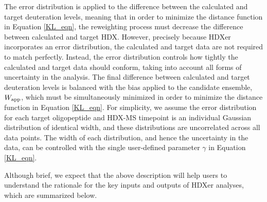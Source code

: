 \documentclass[9pt,tutorial,ASAPversion]{livecoms}
\begin{document}
The error distribution is applied to the difference between the calculated and target deuteration levels, meaning that in order to minimize the distance function in Equation \ref{KL_eqn}, the reweighting process must decrease the difference between calculated and target HDX. 
However, precisely because HDXer incorporates an error distribution, the calculated and target data are not required to match perfectly.
Instead, the error distribution controls how tightly the calculated and target data should conform, taking into account all forms of uncertainty in the analysis.
The final difference between calculated and target deuteration levels is balanced with the bias applied to the candidate ensemble, $W_\textnormal{app}$, which must be simultaneously minimized in order to minimize the distance function in Equation \ref{KL_eqn}. 
For simplicity, we assume the error distribution for each target oligopeptide and HDX-MS timepoint is an individual Gaussian distribution of identical width, and these distributions are uncorrelated across all data points.
The width of each distribution, and hence the uncertainty in the data, can be controlled with the single user-defined parameter $\gamma$ in Equation \ref{KL_eqn}.

Although brief, we expect that the above description will help users to understand the rationale for the key inputs and outputs of HDXer analyses, which are summarized below.
\end{document}
